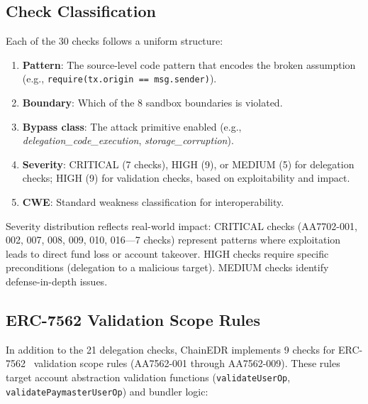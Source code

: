 \subsection{Check Classification}

Each of the 30 checks follows a uniform structure:

\begin{enumerate}
    \item \textbf{Pattern}: The source-level code pattern that encodes the broken assumption (e.g., \texttt{require(tx.origin == msg.sender)}).
    \item \textbf{Boundary}: Which of the 8 sandbox boundaries is violated.
    \item \textbf{Bypass class}: The attack primitive enabled (e.g., \textit{delegation\_code\_execution}, \textit{storage\_corruption}).
    \item \textbf{Severity}: CRITICAL (7 checks), HIGH (9), or MEDIUM (5) for delegation checks; HIGH (9) for validation checks, based on exploitability and impact.
    \item \textbf{CWE}: Standard weakness classification for interoperability.
\end{enumerate}

Severity distribution reflects real-world impact: CRITICAL checks (AA7702-001, 002, 007, 008, 009, 010, 016---7 checks) represent patterns where exploitation leads to direct fund loss or account takeover. HIGH checks require specific preconditions (delegation to a malicious target). MEDIUM checks identify defense-in-depth issues.

\subsection{ERC-7562 Validation Scope Rules}

In addition to the 21 delegation checks, ChainEDR implements 9 checks for ERC-7562~\cite{erc7562} validation scope rules (AA7562-001 through AA7562-009). These rules target account abstraction validation functions (\texttt{validateUserOp}, \texttt{validatePaymasterUserOp}) and bundler logic:

